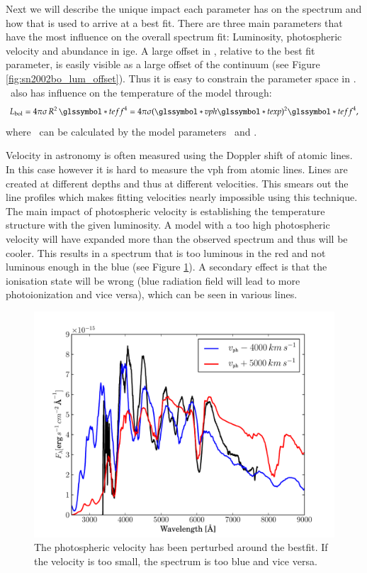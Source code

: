 Next we will describe the unique impact each parameter has on the spectrum and how that is used to arrive at a best fit. There are three main parameters that have the most influence on the overall spectrum fit: Luminosity, photospheric velocity and abundance in \gls{ige}.
A large offset in \lum, relative to the best fit parameter, is easily visible as a large offset of the continuum (see Figure \ref{fig:sn2002bo_lum_offset}). Thus it is easy to constrain the parameter space in \lum. \lum\ also has influence on the temperature of the model through:
\[
L_{\rm bol} = 4\pi\sigma\, R^2\,\teff^4 = 4\pi\sigma(\vph\texp)^2 \teff^4,
\label{eq:lum_temp_relation}
\]
where \teff\ can be calculated by the model parameters \lum\ and \vph. 

Velocity in astronomy is often measured using the Doppler shift of atomic lines. In this case however it is hard to measure the \gls{vph} from atomic lines.  Lines are created at different depths and thus at different velocities. This smears out the line profiles which makes fitting velocities nearly impossible using this technique. The main impact of photospheric velocity is establishing the temperature structure with the given luminosity. A model with a too high photospheric velocity will have expanded more than the observed spectrum and thus will be cooler. This results in a spectrum that is too luminous in the red and not luminous enough in the blue (see Figure \ref{fig:sn2002bo_vph_offset}). A secondary effect is that the ionisation state will be wrong (blue radiation field will lead to more photoionization and vice versa), which can be seen in various lines. 


\begin{figure}[tb] %
   \centering
   \includegraphics[width=\textwidth, trim=0 0 1cm 0, clip]{chapter_dalek/plots/bf2002bo-10_vph.pdf} 
   \caption[Effect of photospheric velocity on MLMC fit]{The photospheric velocity has been perturbed around the bestfit. If the velocity is too small, the spectrum is too blue and vice versa.}
   \label{fig:sn2002bo_vph_offset}
\end{figure}



